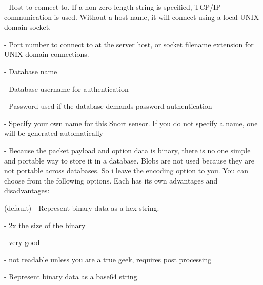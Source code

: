 \documentclass[english]{report}
\begin{document}
\begin{description}{}

\item [\texttt{host}] - Host to connect to. If a non-zero-length string is specified, TCP/IP communication is used. Without a host name, it will connect using a local UNIX domain socket.

\item [\texttt{port}] - Port number to connect to at the server host, or socket
filename extension for UNIX-domain connections. 

\item [\texttt{dbname}] - Database name 

\item [\texttt{user}] - Database username for authentication

\item [\texttt{password}] - Password used if the database demands password
authentication

\item [\texttt{sensor\_name}] - Specify your own name for this Snort sensor. If
you do not specify a name, one will be generated automatically

\item [\texttt{encoding}] - Because the packet payload and option data is
binary, there is no one simple and portable way to store it in a database.
Blobs are not used because they are not portable across databases. So i leave
the encoding option to you. You can choose from the following options. Each has
its own advantages and disadvantages:

   \begin{description}{}
       \item [\texttt{hex}](default) - Represent binary data as a hex string. 

       \begin{description}{}
             \item [Storage~requirements]- 2x the size of the binary
             \item [Searchability]- very good 

             \item [Human~readability]- not readable unless you are a true geek, requires post processing

       \end{description}

       \item [\texttt{base64}] - Represent binary data as a base64 string. 


\end{description}
\end{description}
\end{document}
